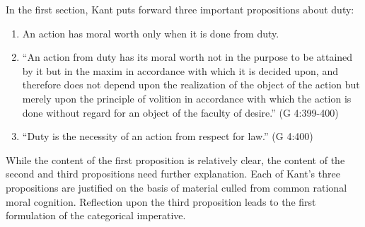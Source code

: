 
In the first section, Kant puts forward three important propositions about duty:
\begin{enumerate}
    \item An action has moral worth only when it is done from duty.
    \item ``An action from duty has its moral worth not in the purpose to be attained by it but in the maxim in accordance with which it is decided upon, and therefore does not depend upon the realization of the object of the action but merely upon the principle of volition in accordance with which the action is done without regard for an object of the faculty of desire.''  (G 4:399-400)
    \item ``Duty is the necessity of an action from respect for law.'' (G 4:400)
\end{enumerate}
While the content of the first proposition is relatively clear, the content of the second and third propositions need further explanation. Each of Kant's three propositions are justified on the basis of material culled from common rational moral cognition. Reflection upon the third proposition leads to the first formulation of the categorical imperative. \change

